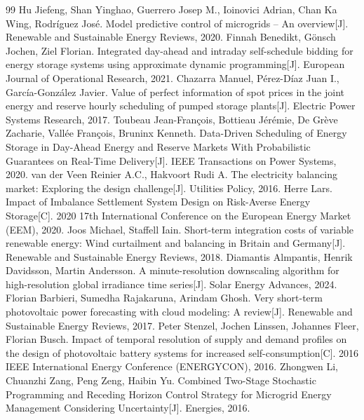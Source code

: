 \begin{thebibliography}{99}
Hu Jiefeng, Shan Yinghao, Guerrero Josep M., Ioinovici Adrian, Chan Ka Wing, Rodríguez José. Model predictive control of microgrids – An overview[J]. Renewable and Sustainable Energy Reviews, 2020.
Finnah Benedikt, Gönsch Jochen, Ziel Florian. Integrated day-ahead and intraday self-schedule bidding for energy storage systems using approximate dynamic programming[J]. European Journal of Operational Research, 2021.
Chazarra Manuel, Pérez-Díaz Juan I., García-González Javier. Value of perfect information of spot prices in the joint energy and reserve hourly scheduling of pumped storage plants[J]. Electric Power Systems Research, 2017.
Toubeau Jean-François, Bottieau Jérémie, De Grève Zacharie, Vallée François, Bruninx Kenneth. Data-Driven Scheduling of Energy Storage in Day-Ahead Energy and Reserve Markets With Probabilistic Guarantees on Real-Time Delivery[J]. IEEE Transactions on Power Systems, 2020.
van der Veen Reinier A.C., Hakvoort Rudi A. The electricity balancing market: Exploring the design challenge[J]. Utilities Policy, 2016.
Herre Lars. Impact of Imbalance Settlement System Design on Risk-Averse Energy Storage[C]. 2020 17th International Conference on the European Energy Market (EEM), 2020.
Joos Michael, Staffell Iain. Short-term integration costs of variable renewable energy: Wind curtailment and balancing in Britain and Germany[J]. Renewable and Sustainable Energy Reviews, 2018.
Diamantis Almpantis, Henrik Davidsson, Martin Andersson. A minute-resolution downscaling algorithm for high-resolution global irradiance time series[J]. Solar Energy Advances, 2024.
Florian Barbieri, Sumedha Rajakaruna, Arindam Ghosh. Very short-term photovoltaic power forecasting with cloud modeling: A review[J]. Renewable and Sustainable Energy Reviews, 2017.
Peter Stenzel, Jochen Linssen, Johannes Fleer, Florian Busch. Impact of temporal resolution of supply and demand profiles on the design of photovoltaic battery systems for increased self-consumption[C]. 2016 IEEE International Energy Conference (ENERGYCON), 2016.
Zhongwen Li, Chuanzhi Zang, Peng Zeng, Haibin Yu. Combined Two-Stage Stochastic Programming and Receding Horizon Control Strategy for Microgrid Energy Management Considering Uncertainty[J]. Energies, 2016.

\end{thebibliography}
